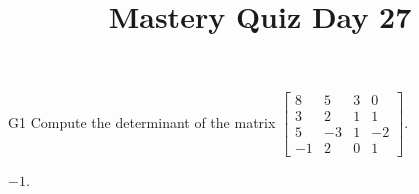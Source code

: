 \documentclass{sbgLAquiz}
\title{Mastery Quiz Day 27 }
\begin{document}
\begin{problem}{G1}
Compute the determinant of the matrix $\begin{bmatrix} 8 & 5 & 3 & 0 \\ 3 & 2 & 1 & 1 \\ 5 & -3 & 1 & -2 \\ -1 & 2 & 0 & 1\end{bmatrix} $.
\end{problem}
\begin{solution}
$-1$.
\end{solution}
\end{document}
